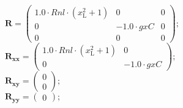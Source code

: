 \documentclass[11pt, oneside]{article}      %
\begin{document}
%
$ \mathbf{R} = \left(\begin{array}{ccc}1.0 \cdot Rnl \cdot \left(x_{\mathrm{L}}^{2} + 1\right) & 0 & 0\\0 & - 1.0 \cdot gxC & 0\\0 & 0 & 0\end{array}\right) ; $ 
%
\\
%
$ \mathbf{R_{xx}} = \left(\begin{array}{cc}1.0 \cdot Rnl \cdot \left(x_{\mathrm{L}}^{2} + 1\right) & 0\\0 & - 1.0 \cdot gxC\end{array}\right) ; $ 
%
\\
%
$ \mathbf{R_{xy}} = \left(\begin{array}{c}0\\0\end{array}\right) ; $ 
%
\\
%
$ \mathbf{R_{yy}} = \left(\begin{array}{c}0\end{array}\right) ; $ 
%
\\
%
\end{document}
